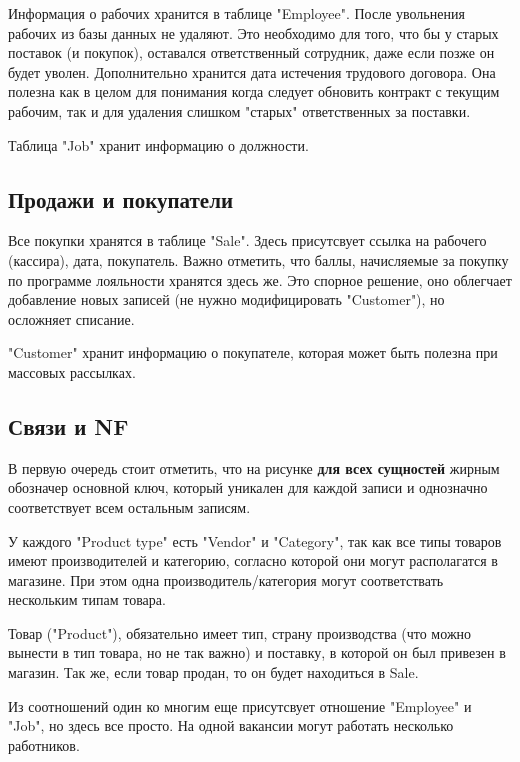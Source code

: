Информация о рабочих хранится в таблице "Employee". После увольнения рабочих из базы данных не удаляют. Это необходимо для того, что бы у старых поставок (и покупок), оставался ответственный сотрудник, даже если позже он будет уволен. Дополнительно хранится дата истечения трудового договора. Она полезна как в целом для понимания когда следует обновить контракт с текущим рабочим, так и для удаления слишком "старых" ответственных за поставки. 

Таблица "Job" хранит информацию о должности.

\subsection{Продажи и покупатели}

Все покупки хранятся в таблице "Sale". Здесь присутсвует ссылка на рабочего (кассира), дата, покупатель. Важно отметить, что баллы, начисляемые за покупку по программе лояльности хранятся здесь же. Это спорное решение, оно облегчает добавление новых записей (не нужно модифицировать "Customer"), но осложняет списание.

"Customer" хранит информацию о покупателе, которая может быть полезна при массовых рассылках.

\subsection{Связи и NF}

В первую очередь стоит отметить, что на рисунке \textbf{для всех сущностей} жирным обозначер основной ключ, который уникален для каждой записи и однозначно соответствует всем остальным записям.

У каждого "Product type" есть "Vendor" и "Category", так как все типы товаров имеют производителей и категорию, согласно которой они могут располагатся в магазине. При этом одна производитель/категория могут соответствать нескольким типам товара.

Товар ("Product"), обязательно имеет тип, страну производства (что можно вынести в тип товара, но не так важно) и поставку, в которой он был привезен в магазин. Так же, если товар продан, то он будет находиться в Sale.

Из соотношений один ко многим еще присутсвует отношение "Employee" и "Job", но здесь все просто. На одной вакансии могут работать несколько работников.